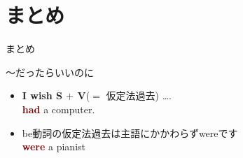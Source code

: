 \documentclass[aspectratio=169,xcolor={dvipsnames,table}]{beamer}
\begin{document}
\section{まとめ}
\begin{frame}[plain]{まとめ}
 
\begin{block}{～だったらいいのに}
\small
\begin{itemize}[square]
 \item {\bfseries I wish S $+$ V}($=$ {\scriptsize 仮定法過去}) \ldots .\\
\hspace*{40pt}{\bfseries I wish I} \textcolor{Maroon}{\bfseries had} a computer.
 \item be動詞の仮定法過去は主語にかかわらずwereです\\
\hspace*{40pt}{\bfseries I wish I} \textcolor{Maroon}{\bfseries were} a pianist
\end{itemize}
\end{block}



\end{frame}
\end{document}
